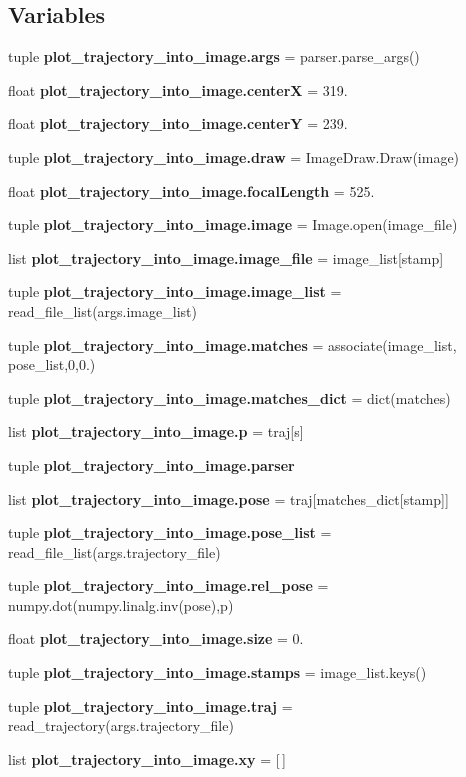 \subsection*{\-Variables}
\begin{DoxyCompactItemize}
\item 
tuple {\bf plot\-\_\-trajectory\-\_\-into\-\_\-image.\-args} = parser.\-parse\-\_\-args()
\item 
float {\bf plot\-\_\-trajectory\-\_\-into\-\_\-image.\-center\-X} = 319.
\item 
float {\bf plot\-\_\-trajectory\-\_\-into\-\_\-image.\-center\-Y} = 239.
\item 
tuple {\bf plot\-\_\-trajectory\-\_\-into\-\_\-image.\-draw} = \-Image\-Draw.\-Draw(image)
\item 
float {\bf plot\-\_\-trajectory\-\_\-into\-\_\-image.\-focal\-Length} = 525.
\item 
tuple {\bf plot\-\_\-trajectory\-\_\-into\-\_\-image.\-image} = \-Image.\-open(image\-\_\-file)
\item 
list {\bf plot\-\_\-trajectory\-\_\-into\-\_\-image.\-image\-\_\-file} = image\-\_\-list[stamp]
\item 
tuple {\bf plot\-\_\-trajectory\-\_\-into\-\_\-image.\-image\-\_\-list} = read\-\_\-file\-\_\-list(args.\-image\-\_\-list)
\item 
tuple {\bf plot\-\_\-trajectory\-\_\-into\-\_\-image.\-matches} = associate(image\-\_\-list, pose\-\_\-list,0,0.)
\item 
tuple {\bf plot\-\_\-trajectory\-\_\-into\-\_\-image.\-matches\-\_\-dict} = dict(matches)
\item 
list {\bf plot\-\_\-trajectory\-\_\-into\-\_\-image.\-p} = traj[s]
\item 
tuple {\bf plot\-\_\-trajectory\-\_\-into\-\_\-image.\-parser}
\item 
list {\bf plot\-\_\-trajectory\-\_\-into\-\_\-image.\-pose} = traj[matches\-\_\-dict[stamp]]
\item 
tuple {\bf plot\-\_\-trajectory\-\_\-into\-\_\-image.\-pose\-\_\-list} = read\-\_\-file\-\_\-list(args.\-trajectory\-\_\-file)
\item 
tuple {\bf plot\-\_\-trajectory\-\_\-into\-\_\-image.\-rel\-\_\-pose} = numpy.\-dot(numpy.\-linalg.\-inv(pose),p)
\item 
float {\bf plot\-\_\-trajectory\-\_\-into\-\_\-image.\-size} = 0.
\item 
tuple {\bf plot\-\_\-trajectory\-\_\-into\-\_\-image.\-stamps} = image\-\_\-list.\-keys()
\item 
tuple {\bf plot\-\_\-trajectory\-\_\-into\-\_\-image.\-traj} = read\-\_\-trajectory(args.\-trajectory\-\_\-file)
\item 
list {\bf plot\-\_\-trajectory\-\_\-into\-\_\-image.\-xy} = [$\,$]
\end{DoxyCompactItemize}
